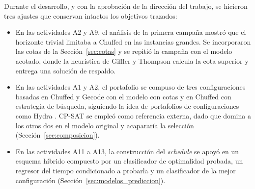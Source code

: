 Durante el desarrollo, y con la aprobación de la dirección del trabajo, se
hicieron tres ajustes que conservan intactos los objetivos trazados:

\begin{itemize}
  \item En las actividades A2 y A9, el análisis de la primera campaña mostró
    que el horizonte trivial limitaba a Chuffed en las instancias grandes. Se
    incorporaron las cotas de la Sección~\ref{sec:cotas} y se repitió la
    campaña con el modelo acotado, donde la heurística de Giffler y Thompson
    calcula la cota superior y entrega una solución de respaldo.
  \item En las actividades A1 y A2, el portafolio se compuso de tres
    configuraciones basadas en Chuffed y Gecode con el modelo con cotas y en
    Chuffed con estrategia de búsqueda, siguiendo la idea de portafolios de
    configuraciones como Hydra \citep{xu2010hydra}. CP-SAT se empleó como
    referencia externa, dado que domina a los otros dos en el modelo original y
    acapararía la selección (Sección~\ref{sec:composicion}).
  \item En las actividades A11 a A13, la construcción del \textit{schedule} se
    apoyó en un esquema híbrido compuesto por un clasificador de optimalidad
    probada, un regresor del tiempo condicionado a probarla y un clasificador
    de la mejor configuración (Sección~\ref{sec:modelos_prediccion}).
\end{itemize}
